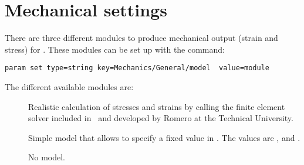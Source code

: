 \section{Mechanical settings}

There are three different modules to produce mechanical output (strain and stress) for \MMonCa. These modules can be set up with the command:

\begin{lstlisting}
param set type=string key=Mechanics/General/model  value=module
\end{lstlisting}

The different available modules are:
\begin{description}
\item[] Realistic calculation of stresses and strains by calling the finite element solver included in \MMonCa\ and developed by
 Romero at the Technical University.
\item[] Simple model that allows to specify a fixed value in . The values are ,  and .
\item[] No model.
\end{description}
